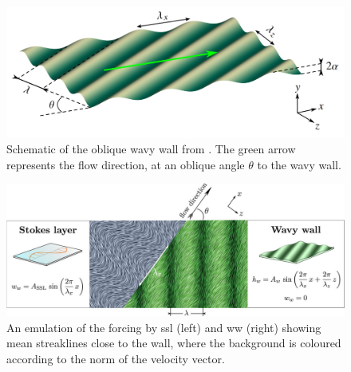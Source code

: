 \begin{figure}[htbp]
	\centering
	\includegraphics[width=0.7\linewidth]{introduction/fig/ww.jpg}
	\caption[Schematic of the oblique wavy wall]{Schematic of the oblique wavy wall from \cite{ghebali2018}. The green arrow represents the flow direction, at an oblique angle $\theta$ to the wavy wall.}
	\label{fig:ww}
\end{figure}
\begin{figure}[htbp]
	\centering
	\includegraphics[width=0.7\linewidth]{introduction/fig/wwssl.jpeg}
	\caption[Comparison of mean streaklines close to the wall between SSL and WW]{An emulation of the forcing by \gls{ssl} (left) and \gls{ww} (right) showing mean streaklines close to the wall, where the background is coloured according to the norm of the velocity vector.}
	\label{fig:sslwwcomparison}
\end{figure}



